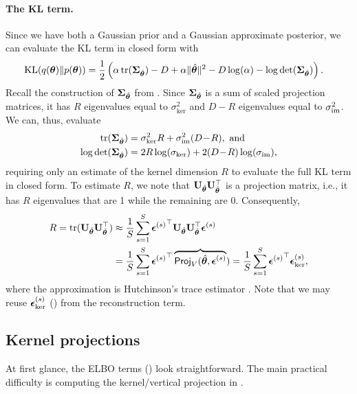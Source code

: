\paragraph{The KL term.}
Since we have both a Gaussian prior and a Gaussian approximate posterior, we can evaluate the KL term in closed form with
\begin{align}
  \label{eq:elbo-kl}
  \mathrm{KL}( q(\bm{\theta}) \| p(\bm{\theta}) )
    &= \frac{1}{2} \left( \alpha  \operatorname{tr}(\mathbf{\Sigma}_{\hat{\bm{\theta}}}) - D + \alpha \|\hat{\bm{\theta}}\|^2 - D \log(\alpha) - \log\det(\mathbf{\Sigma}_{\hat{\bm{\theta}}}) \right).
\end{align}
Recall the construction of $\mathbf{\Sigma}_{\hat{\bm{\theta}}}$ from .
Since $\mathbf{\Sigma}_{\hat{\bm{\theta}}}$ is a sum of scaled projection matrices, it has $R$ eigenvalues equal to $\sigma_{\ker}^2$ and $D\!-\!R$ eigenvalues equal to $\sigma_{\operatorname{im}}^2$.
We can, thus, evaluate
\begin{align}
  \label{eq:trSigma}
  \operatorname{tr}(\mathbf{\Sigma}_{\hat{\bm{\theta}}})   &= \sigma_{\ker}^2 R + \sigma_{\operatorname{im}}^2 (D\!-\!R), \text{ and} \\
  \log\det(\mathbf{\Sigma}_{\hat{\bm{\theta}}}) &= 2 R \log(\sigma_{\ker}) + 2(D\!-\!R) \log(\sigma_{\operatorname{im}}),
\end{align}
requiring only an estimate of the kernel dimension $R$ to evaluate the full KL term in closed form.
To estimate $R$, we note that $\mathbf{U}_{\hat{\bm{\theta}}}\mathbf{U}_{\hat{\bm{\theta}}}^{\top}$ is a projection matrix, i.e., it has $R$ eigenvalues that are 1 while the remaining are 0. Consequently,
\begin{align}
  R = \operatorname{tr}(\mathbf{U}_{\hat{\bm{\theta}}}\mathbf{U}_{\hat{\bm{\theta}}}^{\top})
    &\approx \frac{1}{S} \sum_{s=1}^S {\bm{\epsilon}^{(s)}}^{\top} \mathbf{U}_{\hat{\bm{\theta}}}\mathbf{U}_{\hat{\bm{\theta}}}^{\top} \bm{\epsilon}^{(s)} \\
    &= \frac{1}{S} \sum_{s=1}^S {\bm{\epsilon}^{(s)}}^{\top} \overbrace{\textsf{Proj}_V(\hat{\bm{\theta}}, \bm{\epsilon}^{(s)}}) = \frac{1}{S} \sum_{s=1}^S  {\bm{\epsilon}^{(s)}}^{\top} \bm{\epsilon}_{\ker}^{(s)},
\end{align}
where the approximation is Hutchinson's trace estimator \citep{hutchinson1989stochastic}. Note that we may reuse $\bm{\epsilon}_{\ker}^{(s)}$ () from the reconstruction term.

\subsection{Kernel projections}\label{sec:kernel-projections}
At first glance, the ELBO terms () look straightforward.
The main practical difficulty is computing the kernel/vertical projection in . 

